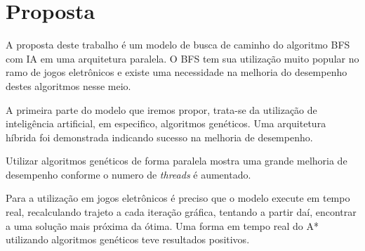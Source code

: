 
\chapter[Proposta]{Proposta}
A proposta deste trabalho é um modelo de busca de caminho do algoritmo BFS com IA em uma arquitetura paralela. O BFS tem sua utilização muito popular no ramo de jogos eletrônicos e existe uma necessidade na melhoria do desempenho destes algoritmos nesse meio. \cite{Ross_Graham}

A primeira parte do modelo que iremos propor, trata-se da utilização de inteligência artificial, em especifico, algoritmos genéticos. Uma arquitetura híbrida foi demonstrada indicando sucesso na melhoria de desempenho. \cite{Ryan}

Utilizar algoritmos genéticos de forma paralela mostra uma grande melhoria de desempenho conforme o numero de \textit{threads} é aumentado. \cite{Reza}

Para a utilização em jogos eletrônicos é preciso que o modelo execute em tempo real, recalculando trajeto a cada iteração gráfica, tentando a partir daí, encontrar a uma solução mais próxima da ótima. Uma forma em tempo real do A* utilizando algoritmos genéticos teve resultados positivos. \cite{Ulysses2}